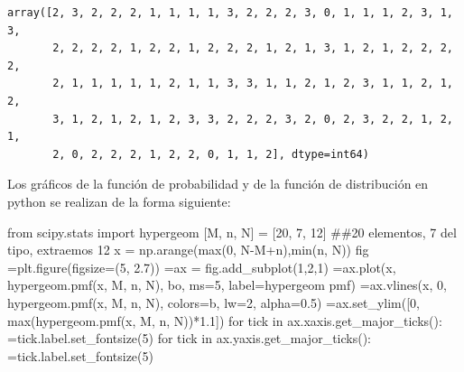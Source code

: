 \documentclass[
  letterpaper,
  DIV=11,
  numbers=noendperiod]{scrreprt}
\newenvironment{Shaded}{\begin{snugshade}}{\end{snugshade}}
\newcommand{\BuiltInTok}[1]{\textcolor[rgb]{0.00,0.23,0.31}{#1}}
\newcommand{\CommentTok}[1]{\textcolor[rgb]{0.37,0.37,0.37}{#1}}
\newcommand{\ControlFlowTok}[1]{\textcolor[rgb]{0.00,0.23,0.31}{#1}}
\newcommand{\DecValTok}[1]{\textcolor[rgb]{0.68,0.00,0.00}{#1}}
\newcommand{\FloatTok}[1]{\textcolor[rgb]{0.68,0.00,0.00}{#1}}
\newcommand{\ImportTok}[1]{\textcolor[rgb]{0.00,0.46,0.62}{#1}}
\newcommand{\KeywordTok}[1]{\textcolor[rgb]{0.00,0.23,0.31}{#1}}
\newcommand{\NormalTok}[1]{\textcolor[rgb]{0.00,0.23,0.31}{#1}}
\newcommand{\OperatorTok}[1]{\textcolor[rgb]{0.37,0.37,0.37}{#1}}
\newcommand{\StringTok}[1]{\textcolor[rgb]{0.13,0.47,0.30}{#1}}
\begin{document}
\begin{verbatim}
array([2, 3, 2, 2, 2, 1, 1, 1, 1, 3, 2, 2, 2, 3, 0, 1, 1, 1, 2, 3, 1, 3,
       2, 2, 2, 2, 1, 2, 2, 1, 2, 2, 2, 1, 2, 1, 3, 1, 2, 1, 2, 2, 2, 2,
       2, 1, 1, 1, 1, 1, 2, 1, 1, 3, 3, 1, 1, 2, 1, 2, 3, 1, 1, 2, 1, 2,
       3, 1, 2, 1, 2, 1, 2, 3, 3, 2, 2, 2, 3, 2, 0, 2, 3, 2, 2, 1, 2, 1,
       2, 0, 2, 2, 2, 1, 2, 2, 0, 1, 1, 2], dtype=int64)
\end{verbatim}

Los gráficos de la función de probabilidad y de la función de
distribución en python se realizan de la forma siguiente:

\begin{Shaded}
\begin{Highlighting}[]
\ImportTok{from}\NormalTok{ scipy.stats }\ImportTok{import}\NormalTok{ hypergeom}
\NormalTok{[M, n, N] }\OperatorTok{=}\NormalTok{ [}\DecValTok{20}\NormalTok{, }\DecValTok{7}\NormalTok{, }\DecValTok{12}\NormalTok{] }\CommentTok{\#\#20 elementos, 7 del tipo, extraemos 12}
\NormalTok{x }\OperatorTok{=}\NormalTok{ np.arange(}\BuiltInTok{max}\NormalTok{(}\DecValTok{0}\NormalTok{, N}\OperatorTok{{-}}\NormalTok{M}\OperatorTok{+}\NormalTok{n),}\BuiltInTok{min}\NormalTok{(n, N))}
\NormalTok{fig }\OperatorTok{=}\NormalTok{plt.figure(figsize}\OperatorTok{=}\NormalTok{(}\DecValTok{5}\NormalTok{, }\FloatTok{2.7}\NormalTok{))}
 \OperatorTok{=}\NormalTok{ax }\OperatorTok{=}\NormalTok{ fig.add\_subplot(}\DecValTok{1}\NormalTok{,}\DecValTok{2}\NormalTok{,}\DecValTok{1}\NormalTok{)}
 \OperatorTok{=}\NormalTok{ax.plot(x, hypergeom.pmf(x, M, n, N), }\StringTok{\textquotesingle{}bo\textquotesingle{}}\NormalTok{, ms}\OperatorTok{=}\DecValTok{5}\NormalTok{, label}\OperatorTok{=}\StringTok{\textquotesingle{}hypergeom pmf\textquotesingle{}}\NormalTok{)}
 \OperatorTok{=}\NormalTok{ax.vlines(x, }\DecValTok{0}\NormalTok{, hypergeom.pmf(x, M, n, N), colors}\OperatorTok{=}\StringTok{\textquotesingle{}b\textquotesingle{}}\NormalTok{, lw}\OperatorTok{=}\DecValTok{2}\NormalTok{, alpha}\OperatorTok{=}\FloatTok{0.5}\NormalTok{)}
 \OperatorTok{=}\NormalTok{ax.set\_ylim([}\DecValTok{0}\NormalTok{, }\BuiltInTok{max}\NormalTok{(hypergeom.pmf(x, M, n, N))}\OperatorTok{*}\FloatTok{1.1}\NormalTok{])}
\ControlFlowTok{for}\NormalTok{ tick }\KeywordTok{in}\NormalTok{ ax.xaxis.get\_major\_ticks():}
   \OperatorTok{=}\NormalTok{tick.label.set\_fontsize(}\DecValTok{5}\NormalTok{)}
\ControlFlowTok{for}\NormalTok{ tick }\KeywordTok{in}\NormalTok{ ax.yaxis.get\_major\_ticks():}
  \OperatorTok{=}\NormalTok{tick.label.set\_fontsize(}\DecValTok{5}\NormalTok{) }

\end{Highlighting}
\end{Shaded}
\end{document}
